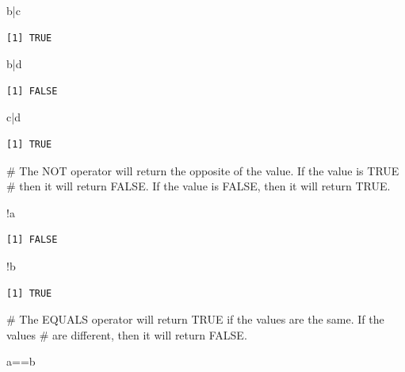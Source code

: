 \documentclass[
  letterpaper,
  DIV=11,
  numbers=noendperiod]{scrreprt}
\newenvironment{Shaded}{\begin{snugshade}}{\end{snugshade}}
\newcommand{\CommentTok}[1]{\textcolor[rgb]{0.37,0.37,0.37}{#1}}
\newcommand{\NormalTok}[1]{\textcolor[rgb]{0.00,0.23,0.31}{#1}}
\newcommand{\SpecialCharTok}[1]{\textcolor[rgb]{0.37,0.37,0.37}{#1}}
\begin{document}
\begin{Shaded}
\begin{Highlighting}[]
\NormalTok{b}\SpecialCharTok{|}\NormalTok{c}
\end{Highlighting}
\end{Shaded}

\begin{verbatim}
[1] TRUE
\end{verbatim}

\begin{Shaded}
\begin{Highlighting}[]
\NormalTok{b}\SpecialCharTok{|}\NormalTok{d}
\end{Highlighting}
\end{Shaded}

\begin{verbatim}
[1] FALSE
\end{verbatim}

\begin{Shaded}
\begin{Highlighting}[]
\NormalTok{c}\SpecialCharTok{|}\NormalTok{d}
\end{Highlighting}
\end{Shaded}

\begin{verbatim}
[1] TRUE
\end{verbatim}

\begin{Shaded}
\begin{Highlighting}[]
\CommentTok{\# The NOT operator will return the opposite of the value. If the value is TRUE}
\CommentTok{\# then it will return FALSE. If the value is FALSE, then it will return TRUE.}

\SpecialCharTok{!}\NormalTok{a}
\end{Highlighting}
\end{Shaded}

\begin{verbatim}
[1] FALSE
\end{verbatim}

\begin{Shaded}
\begin{Highlighting}[]
\SpecialCharTok{!}\NormalTok{b}
\end{Highlighting}
\end{Shaded}

\begin{verbatim}
[1] TRUE
\end{verbatim}

\begin{Shaded}
\begin{Highlighting}[]
\CommentTok{\# The EQUALS operator will return TRUE if the values are the same. If the values}
\CommentTok{\# are different, then it will return FALSE.}

\NormalTok{a}\SpecialCharTok{==}\NormalTok{b}
\end{Highlighting}
\end{Shaded}
\end{document}
